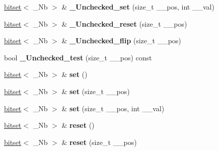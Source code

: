 \begin{DoxyCompactItemize}
\item 
\mbox{\label{classbitset_a7be77ac6d101c08d0acead5390205e65}} 
\hyperlink{classbitset}{bitset}$<$ \+\_\+\+Nb $>$ \& {\bfseries \+\_\+\+Unchecked\+\_\+set} (size\+\_\+t \+\_\+\+\_\+pos, int \+\_\+\+\_\+val)
\item 
\mbox{\label{classbitset_a7fc31a95d2c425274148007429a31926}} 
\hyperlink{classbitset}{bitset}$<$ \+\_\+\+Nb $>$ \& {\bfseries \+\_\+\+Unchecked\+\_\+reset} (size\+\_\+t \+\_\+\+\_\+pos)
\item 
\mbox{\label{classbitset_abb68170c89fb0d4ac113f8cfae8e4488}} 
\hyperlink{classbitset}{bitset}$<$ \+\_\+\+Nb $>$ \& {\bfseries \+\_\+\+Unchecked\+\_\+flip} (size\+\_\+t \+\_\+\+\_\+pos)
\item 
\mbox{\label{classbitset_afe47865477bfd468823d2210fad66c98}} 
bool {\bfseries \+\_\+\+Unchecked\+\_\+test} (size\+\_\+t \+\_\+\+\_\+pos) const
\item 
\mbox{\label{classbitset_a2e86e1a8c245578eb6f4d7e48bb28a46}} 
\hyperlink{classbitset}{bitset}$<$ \+\_\+\+Nb $>$ \& {\bfseries set} ()
\item 
\mbox{\label{classbitset_ae9b99264a3541748fa74a875f024b124}} 
\hyperlink{classbitset}{bitset}$<$ \+\_\+\+Nb $>$ \& {\bfseries set} (size\+\_\+t \+\_\+\+\_\+pos)
\item 
\mbox{\label{classbitset_ad3a0e6a4bd97d25c2a2bfbdb1453b336}} 
\hyperlink{classbitset}{bitset}$<$ \+\_\+\+Nb $>$ \& {\bfseries set} (size\+\_\+t \+\_\+\+\_\+pos, int \+\_\+\+\_\+val)
\item 
\mbox{\label{classbitset_aa483a42b933b54f0b5c71bac0160ef70}} 
\hyperlink{classbitset}{bitset}$<$ \+\_\+\+Nb $>$ \& {\bfseries reset} ()
\item 
\mbox{\label{classbitset_a2af51e4c6bf284831c3f9b21b127b27b}} 
\hyperlink{classbitset}{bitset}$<$ \+\_\+\+Nb $>$ \& {\bfseries reset} (size\+\_\+t \+\_\+\+\_\+pos)
\item 
\mbox{\label{classbitset_aa0077b900ad5b66e21818cdc008452a4}} 

\end{DoxyCompactItemize}
